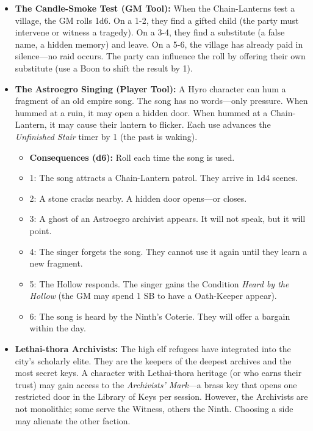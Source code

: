 \begin{itemize}
\item \textbf{The Candle-Smoke Test (GM Tool):} When the Chain-Lanterns test a village, the GM rolls 1d6. On a 1-2, they find a gifted child (the party must intervene or witness a tragedy). On a 3-4, they find a substitute (a false name, a hidden memory) and leave. On a 5-6, the village has already paid in silence---no raid occurs. The party can influence the roll by offering their own substitute (use a Boon to shift the result by 1).

\item \textbf{The Astroegro Singing (Player Tool):} A Hyro character can hum a fragment of an old empire song. The song has no words---only pressure. When hummed at a ruin, it may open a hidden door. When hummed at a Chain-Lantern, it may cause their lantern to flicker. Each use advances the \emph{Unfinished Stair} timer by 1 (the past is waking).
  \begin{itemize}
    \item \textbf{Consequences (d6):} Roll each time the song is used.
    \item 1: The song attracts a Chain-Lantern patrol. They arrive in 1d4 scenes.
    \item 2: A stone cracks nearby. A hidden door opens---or closes.
    \item 3: A ghost of an Astroegro archivist appears. It will not speak, but it will point.
    \item 4: The singer forgets the song. They cannot use it again until they learn a new fragment.
    \item 5: The Hollow responds. The singer gains the Condition \textit{Heard by the Hollow} (the GM may spend 1 SB to have a Oath-Keeper appear).
    \item 6: The song is heard by the Ninth's Coterie. They will offer a bargain within the day.
  \end{itemize}

\item \textbf{Lethai-thora Archivists:} The high elf refugees have integrated into the city's scholarly elite. They are the keepers of the deepest archives and the most secret keys. A character with Lethai-thora heritage (or who earns their trust) may gain access to the \emph{Archivists' Mark}---a brass key that opens one restricted door in the Library of Keys per session. However, the Archivists are not monolithic; some serve the Witness, others the Ninth. Choosing a side may alienate the other faction.


\end{itemize}
